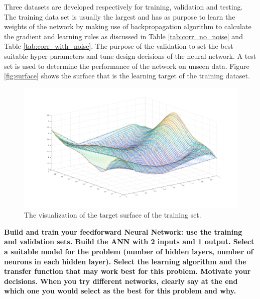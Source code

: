 \documentclass[a4paper,10pt]{article}
\begin{document}
Three datasets are developed respectively for training, validation and testing. The training data set is usually the largest and has as purpose to learn the weights of the network by making use of backpropagation algorithm to calculate the gradient and learning rules as discussed in Table \ref{tab:corr_no_noise} and Table \ref{tab:corr_with_noise}. The purpose of the validation to set the best suitable hyper parameters and tune design decisions of the neural network. A test set is used to determine the performance of the network on unseen data. Figure \ref{fig:surface} shows the surface that is the learning target of the training dataset. 

\begin{figure}[h!]
	\centering
	\includegraphics[width=1\textwidth]{surface.png}
	\caption{The visualization of the target surface of the training set.}
	\label{tab:surface}
\end{figure}


\textbf{Build and train your feedforward Neural Network: use the training and validation sets. Build the ANN with 2
	inputs and 1 output. Select a suitable model for the problem (number of hidden layers, number of neurons in
	each hidden layer). Select the learning algorithm and the transfer function that may work best for this problem.
	Motivate your decisions. When you try different networks, clearly say at the end which one you would select as
	the best for this problem and why.}\\
\end{document}
